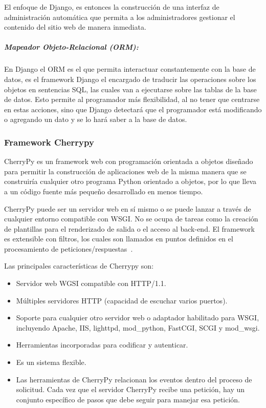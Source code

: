 \documentclass[a4paper]{article}
\begin{document}
El enfoque de Django, es entonces la construcción de una interfaz de administración automática que permita a los administradores gestionar el contenido del sitio web de manera inmediata.

\subparagraph*{Mapeador Objeto-Relacional (ORM):} En Django el ORM es el que permita interactuar constantemente con la base de datos, es el framework Django el encargado de traducir las operaciones sobre los objetos en sentencias SQL, las cuales van a ejecutarse sobre las tablas de la base de datos. Esto permite al programador más flexibilidad, al no tener que centrarse en estas acciones, sino que Django detectará que el programador está modificando o agregando un dato y se lo hará saber a la base de datos.

\subsubsection{Framework Cherrypy}\label{sub:cherrypy}
CherryPy es un framework web con programación orientada a objetos diseñado para permitir la construcción de aplicaciones web de la misma manera que se construiría cualquier otro programa Python orientado a objetos, por lo que lleva a un código fuente más pequeño desarrollado en menos tiempo.

CherryPy puede ser un servidor web en sí mismo o se puede lanzar a través de cualquier entorno compatible con WSGI. No se ocupa de tareas como la creación de plantillas para el renderizado de salida o el acceso al back-end. El framework es extensible con filtros, los cuales son llamados en puntos definidos en el procesamiento de peticiones/respuestas~\citep{Cherrypy}.

Las principales características de Cherrypy son:

\begin{itemize}
	\item Servidor web WGSI compatible con HTTP/1.1.
	\item Múltiples servidores HTTP (capacidad de escuchar varios puertos).
	\item Soporte para cualquier otro servidor web o adaptador habilitado para WSGI, incluyendo Apache, 	IIS, lighttpd, mod\_python, FastCGI, SCGI y mod\_wsgi.
	\item Herramientas incorporadas para codificar y autenticar.
	\item Es un sistema flexible.
	\item Las herramientas de CherryPy relacionan los eventos dentro del proceso de solicitud. Cada vez que el servidor CherryPy recibe una petición, hay un conjunto específico de pasos que debe seguir para manejar esa petición.
\end{itemize}
\end{document}
